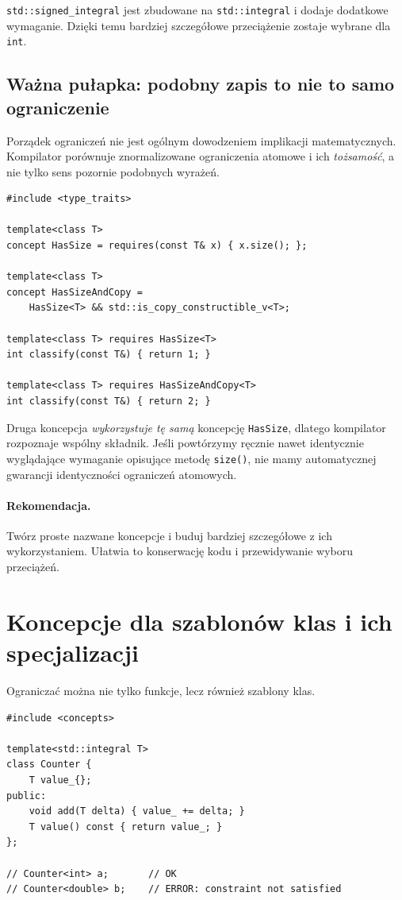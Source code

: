 \texttt{std::signed\_integral} jest zbudowane na
\texttt{std::integral} i dodaje dodatkowe wymaganie. Dzięki temu
bardziej szczegółowe przeciążenie zostaje wybrane dla \texttt{int}.

\subsection{Ważna pułapka: podobny zapis to nie to samo ograniczenie}

Porządek ograniczeń nie jest ogólnym dowodzeniem implikacji
matematycznych. Kompilator porównuje znormalizowane ograniczenia
atomowe i ich \emph{tożsamość}, a nie tylko sens pozornie podobnych
wyrażeń.

\begin{lstlisting}
#include <type_traits>

template<class T>
concept HasSize = requires(const T& x) { x.size(); };

template<class T>
concept HasSizeAndCopy =
    HasSize<T> && std::is_copy_constructible_v<T>;

template<class T> requires HasSize<T>
int classify(const T&) { return 1; }

template<class T> requires HasSizeAndCopy<T>
int classify(const T&) { return 2; }
\end{lstlisting}

Druga koncepcja \emph{wykorzystuje tę samą} koncepcję
\texttt{HasSize}, dlatego kompilator rozpoznaje wspólny
składnik. Jeśli powtórzymy ręcznie nawet identycznie wyglądające
wymaganie opisujące metodę \texttt{size()},
nie mamy automatycznej gwarancji identyczności ograniczeń
atomowych.

\paragraph{Rekomendacja.}
Twórz proste nazwane koncepcje i buduj bardziej szczegółowe
z ich wykorzystaniem. Ułatwia to konserwację kodu i
przewidywanie wyboru przeciążeń.

\section{Koncepcje dla szablonów klas i ich specjalizacji}

Ograniczać można nie tylko funkcje, lecz również szablony klas.

\begin{lstlisting}
#include <concepts>

template<std::integral T>
class Counter {
    T value_{};
public:
    void add(T delta) { value_ += delta; }
    T value() const { return value_; }
};

// Counter<int> a;       // OK
// Counter<double> b;    // ERROR: constraint not satisfied
\end{lstlisting}

